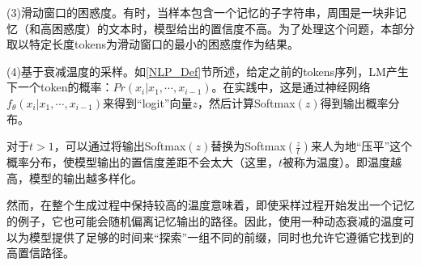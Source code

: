 (3)滑动窗口的困惑度。有时，当样本包含一个记忆的子字符串，周围是一块非记忆（和高困惑度）的文本时，模型给出的置信度不高。为了处理这个问题，本部分取以特定长度tokens为滑动窗口的最小的困惑度作为结果。

(4)基于衰减温度的采样。如\ref{NLP_Def}节所述，给定之前的tokens序列，LM产生下一个token的概率：$Pr(x_i |x_1,⋯,x_{i-1} )$。在实践中，这是通过神经网络$f_θ(x_i|x_1,⋯,x_{i-1})$来得到“logit”向量$z$，然后计算Softmax$(z)$得到输出概率分布。

对于$t>1$，可以通过将输出Softmax$(z)$替换为Softmax$(\frac{z}{t})$来人为地“压平”这个概率分布，使模型输出的置信度差距不会太大（这里，$t$被称为温度）。即温度越高，模型的输出越多样化。

然而，在整个生成过程中保持较高的温度意味着，即使采样过程开始发出一个记忆的例子，它也可能会随机偏离记忆输出的路径。因此，使用一种动态衰减的温度可以为模型提供了足够的时间来“探索”一组不同的前缀，同时也允许它遵循它找到的高置信路径。

%
%
%
%
%
%
%


